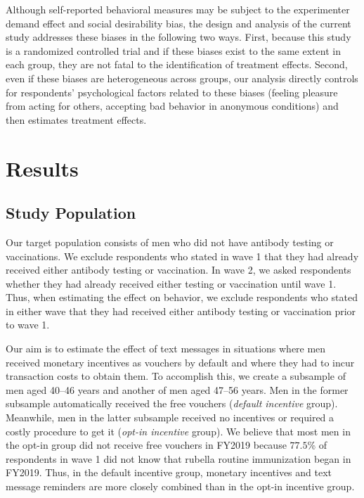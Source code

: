 \documentclass[
]{article}
\begin{document}
Although self-reported behavioral measures may be subject to the experimenter demand effect and social desirability bias, the design and analysis of the current study addresses these biases in the following two ways. First, because this study is a randomized controlled trial and if these biases exist to the same extent in each group, they are not fatal to the identification of treatment effects. Second, even if these biases are heterogeneous across groups, our analysis directly controls for respondents' psychological factors related to these biases (feeling pleasure from acting for others, accepting bad behavior in anonymous conditions) and then estimates treatment effects.

\hypertarget{results}{%
\section{Results}\label{results}}

\hypertarget{sample}{%
\subsection{Study Population}\label{sample}}

Our target population consists of men who did not have antibody testing or vaccinations. We exclude respondents who stated in wave 1 that they had already received either antibody testing or vaccination. In wave 2, we asked respondents whether they had already received either testing or vaccination until wave 1. Thus, when estimating the effect on behavior, we exclude respondents who stated in either wave that they had received either antibody testing or vaccination prior to wave 1.

Our aim is to estimate the effect of text messages in situations where men received monetary incentives as vouchers by default and where they had to incur transaction costs to obtain them. To accomplish this, we create a subsample of men aged 40--46 years and another of men aged 47--56 years. Men in the former subsample automatically received the free vouchers (\emph{default incentive} group). Meanwhile, men in the latter subsample received no incentives or required a costly procedure to get it (\emph{opt-in incentive} group). We believe that most men in the opt-in group did not receive free vouchers in FY2019 because \(77.5\)\% of respondents in wave 1 did not know that rubella routine immunization began in FY2019. Thus, in the default incentive group, monetary incentives and text message reminders are more closely combined than in the opt-in incentive group.
\end{document}
